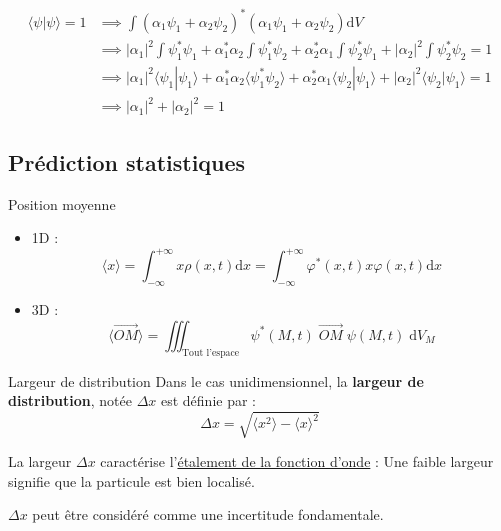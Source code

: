 \begin{myproof}
\begin{align*}
    \langle \psi | \psi \rangle = 1 &\implies \int( \alpha _1\psi_1 + \alpha _2\psi_2)^{*}( \alpha _1 \psi_1 + \alpha _2\psi_2 )\mathrm{d} V \\ 
                                    &\implies |\alpha_1|^2 \int \psi_1 ^* \psi_1 + \alpha_1 ^* \alpha_2 \int \psi_1 ^* \psi_2 + \alpha_2 ^* \alpha_1 \int \psi_2 ^* \psi_1 + | \alpha_2| ^2 \int \psi_2 ^* \psi_2 = 1 \\
                                    &\implies |\alpha_1|^2 \langle \psi_1 | \psi_1 \rangle + \alpha_1 ^* \alpha_2 \langle \psi_1 ^* \psi_2 \rangle + \alpha_2 ^* \alpha_1 \langle \psi_2 | \psi_1 \rangle + | \alpha_2 | ^2 \langle \psi_2 | \psi_1 \rangle = 1 \\
                                    &\implies |\alpha_1|^2 + |\alpha_2| ^2 = 1
\end{align*}
\end{myproof}

\subsection{Prédiction statistiques}

\begin{Definition}[colbacktitle=red!75!black]{Position moyenne}{}
    \begin{itemize}
      \item 1D : \[
          \boxed{\langle x \rangle = \int_{-\infty}^{+\infty} x \rho(x,t) \mathrm{d}x = \displaystyle\int_{-\infty}^{+\infty} \varphi ^{*} (x,t) x \varphi(x, t) \mathrm{d}x}
    \]
  \item 3D : \[
      \langle \overrightarrow{OM} \rangle = \iiint _{\text{Tout l'espace}} \psi ^* (M,t) \;\overrightarrow{OM} \;\psi(M,t) \;\mathrm{d}V _M
  \]
    
    \end{itemize}
\end{Definition}

\begin{Definition}[colbacktitle=red!75!black]{Largeur de distribution}{}
Dans le cas unidimensionnel, la \textbf{largeur de distribution}, notée $\Delta x$ est définie par :
\[
  \boxed{ \Delta x = \sqrt{ \langle x ^2 \rangle - \langle x \rangle ^2}} 
\]

La largeur $\Delta x$ caractérise l'\underline{étalement de la fonction d'onde} : Une faible largeur signifie que la particule est bien localisé.

$\Delta x$ peut être considéré comme une incertitude fondamentale. 
\end{Definition}

